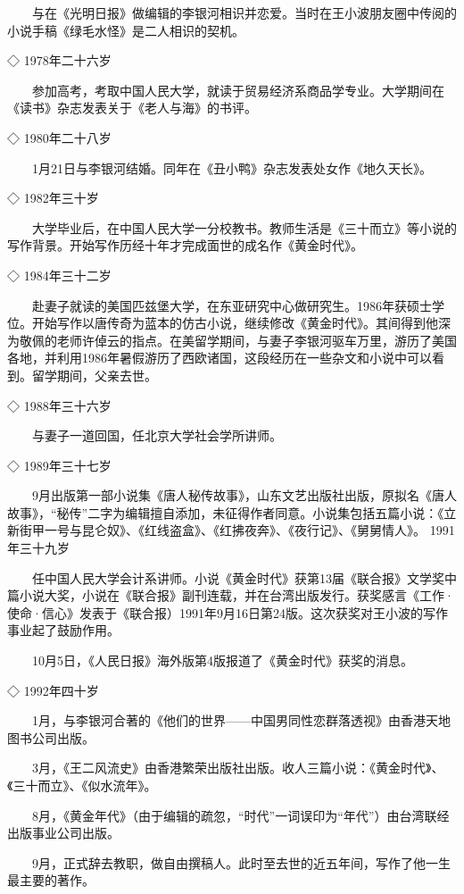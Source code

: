　　与在《光明日报》做编辑的李银河相识并恋爱。当时在王小波朋友圈中传阅的小说手稿《绿毛水怪》是二人相识的契机。

◇ 1978年二十六岁

　　参加高考，考取中国人民大学，就读于贸易经济系商品学专业。大学期间在《读书》杂志发表关于《老人与海》的书评。

◇ 1980年二十八岁

　　1月21日与李银河结婚。同年在《丑小鸭》杂志发表处女作《地久天长》。

◇ 1982年三十岁

　　大学毕业后，在中国人民大学一分校教书。教师生活是《三十而立》等小说的写作背景。开始写作历经十年才完成面世的成名作《黄金时代》。

◇ 1984年三十二岁

　　赴妻子就读的美国匹兹堡大学，在东亚研究中心做研究生。1986年获硕士学位。开始写作以唐传奇为蓝本的仿古小说，继续修改《黄金时代》。其间得到他深为敬佩的老师许倬云的指点。在美留学期间，与妻子李银河驱车万里，游历了美国各地，并利用1986年暑假游历了西欧诸国，这段经历在一些杂文和小说中可以看到。留学期间，父亲去世。

◇ 1988年三十六岁

　　与妻子一道回国，任北京大学社会学所讲师。

◇ 1989年三十七岁

　　9月出版第一部小说集《唐人秘传故事》，山东文艺出版社出版，原拟名《唐人故事》，“秘传”二字为编辑擅自添加，未征得作者同意。小说集包括五篇小说：《立新街甲一号与昆仑奴》、《红线盗盒》、《红拂夜奔》、《夜行记》、《舅舅情人》。 1991年三十九岁

　　任中国人民大学会计系讲师。小说《黄金时代》获第13届《联合报》文学奖中篇小说大奖，小说在《联合报》副刊连载，并在台湾出版发行。获奖感言《工作·使命·信心》发表于《联合报）1991年9月16日第24版。这次获奖对王小波的写作事业起了鼓励作用。

　　10月5日，《人民日报》海外版第4版报道了《黄金时代》获奖的消息。

◇ 1992年四十岁

　　1月，与李银河合著的《他们的世界——中国男同性恋群落透视》由香港天地图书公司出版。 

　　3月，《王二风流史》由香港繁荣出版社出版。收人三篇小说：《黄金时代》、《三十而立》、《似水流年》。

　　8月，《黄金年代》（由于编辑的疏忽，“时代”一词误印为“年代”）由台湾联经出版事业公司出版。

　　9月，正式辞去教职，做自由撰稿人。此时至去世的近五年间，写作了他一生最主要的著作。

